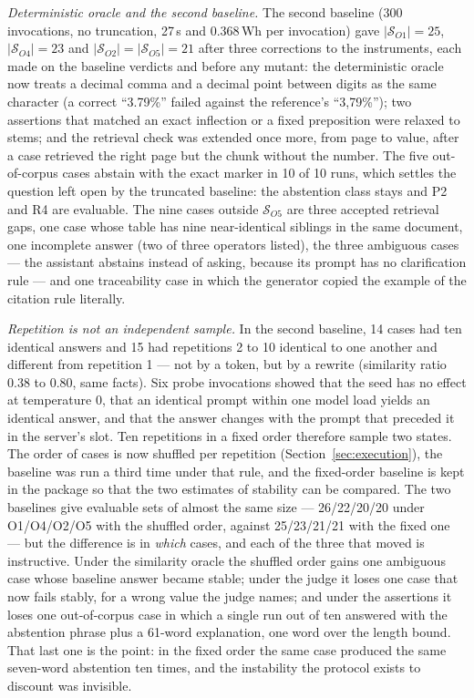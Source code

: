 \documentclass[a4paper,fleqn]{cas-dc}
\newcommand{\Sset}{\mathcal{S}}
\begin{document}
\emph{Deterministic oracle and the second baseline.} The second baseline
(300 invocations, no truncation, 27\,s and 0.368\,Wh per invocation) gave
$|\Sset_{O1}| = 25$, $|\Sset_{O4}| = 23$ and $|\Sset_{O2}| = |\Sset_{O5}| =
21$ after three corrections to the instruments, each made on the baseline
verdicts and before any mutant: the deterministic oracle now treats a decimal
comma and a decimal point between digits as the same character (a correct
``3.79\%'' failed against the reference's ``3,79\%''); two assertions that
matched an exact inflection or a fixed preposition were relaxed to stems;
and the retrieval check was extended once more, from page to value, after a
case retrieved the right page but the chunk without the number. The five
out-of-corpus cases abstain with the exact marker in 10 of 10 runs, which
settles the question left open by the truncated baseline: the abstention
class stays and P2 and R4 are evaluable. The nine cases outside
$\Sset_{O5}$ are three accepted retrieval gaps, one case whose table has
nine near-identical siblings in the same document, one incomplete answer
(two of three operators listed), the three ambiguous cases --- the
assistant abstains instead of asking, because its prompt has no
clarification rule --- and one traceability case in which the generator
copied the example of the citation rule literally.

\emph{Repetition is not an independent sample.} In the second baseline,
14 cases had ten identical answers and 15 had repetitions 2 to 10 identical
to one another and different from repetition 1 --- not by a token, but by a
rewrite (similarity ratio 0.38 to 0.80, same facts). Six probe invocations
showed that the seed has no effect at temperature 0, that an identical
prompt within one model load yields an identical answer, and that the answer
changes with the prompt that preceded it in the server's slot. Ten
repetitions in a fixed order therefore sample two states. The order of cases
is now shuffled per repetition (Section~\ref{sec:execution}), the baseline
was run a third time under that rule, and the fixed-order baseline is kept
in the package so that the two estimates of stability can be compared.
The two baselines give evaluable sets of almost the same size ---
26/22/20/20 under O1/O4/O2/O5 with the shuffled order, against 25/23/21/21
with the fixed one --- but the difference is in \emph{which} cases, and each
of the three that moved is instructive. Under the similarity oracle the
shuffled order gains one ambiguous case whose baseline answer became stable;
under the judge it loses one case that now fails stably, for a wrong value the
judge names; and under the assertions it loses one out-of-corpus case in which
a single run out of ten answered with the abstention phrase plus a 61-word
explanation, one word over the length bound. That last one is the point: in the
fixed order the same case produced the same seven-word abstention ten times,
and the instability the protocol exists to discount was invisible.
\end{document}
